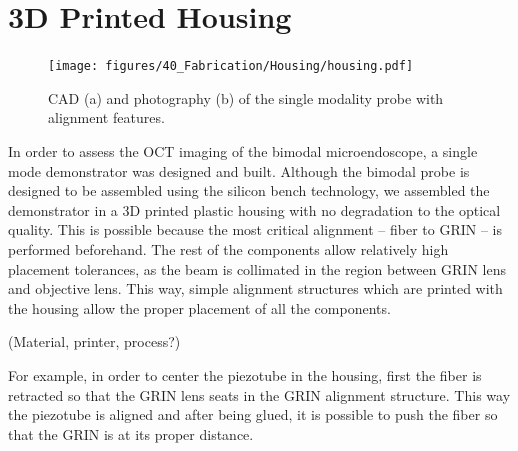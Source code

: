 \section{3D Printed Housing}
\begin{figure}[h!]\centering \texttt{[image: figures/40\_Fabrication/Housing/housing.pdf]}
      \caption{CAD (a) and photography (b) of the single modality probe with alignment features.}
      \label{fig:housing}
\end{figure}

In order to assess the OCT imaging of the bimodal microendoscope, a single mode demonstrator was designed and built. Although the bimodal probe is designed to be assembled using the silicon bench technology, we assembled the demonstrator in a 3D printed plastic housing with no degradation to the optical quality. This is possible because the most critical alignment -- fiber to GRIN -- is performed beforehand. The rest of the components allow relatively high placement tolerances, as the beam is collimated in the region between GRIN lens and objective lens. This way, simple alignment structures which are printed with the housing allow the proper placement of all the components. 

(Material, printer, process?)

For example, in order to center the piezotube in the housing, first the fiber is retracted so that the GRIN lens seats in the GRIN alignment structure. This way the piezotube is aligned and after being glued, it is possible to push the fiber so that the GRIN is at its proper distance. 


\clearpage
